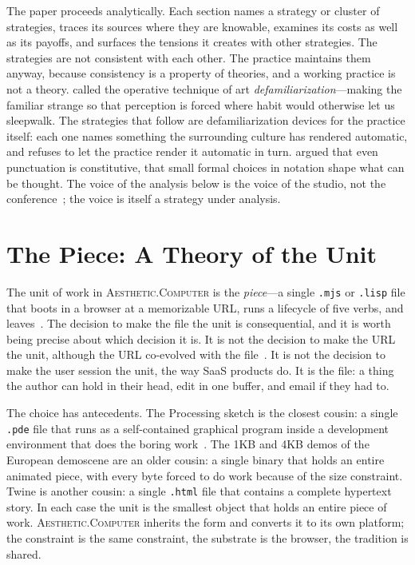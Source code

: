 \documentclass[10pt,letterpaper,twocolumn]{article}
\newcommand{\ac}{\textsc{Aesthetic.Computer}}
\begin{document}
The paper proceeds analytically. Each section names a strategy or cluster of strategies, traces its sources where they are knowable, examines its costs as well as its payoffs, and surfaces the tensions it creates with other strategies. The strategies are not consistent with each other. The practice maintains them anyway, because consistency is a property of theories, and a working practice is not a theory. \citet{shklovsky1917art} called the operative technique of art \emph{defamiliarization}---making the familiar strange so that perception is forced where habit would otherwise let us sleepwalk. The strategies that follow are defamiliarization devices for the practice itself: each one names something the surrounding culture has rendered automatic, and refuses to let the practice render it automatic in turn. \citet{adorno1990punctuation} argued that even punctuation is constitutive, that small formal choices in notation shape what can be thought. The voice of the analysis below is the voice of the studio, not the conference~\citep{scudder2026voice}; the voice is itself a strategy under analysis.

\section{The Piece: A Theory of the Unit}

The unit of work in \ac{} is the \emph{piece}---a single \texttt{.mjs} or \texttt{.lisp} file that boots in a browser at a memorizable URL, runs a lifecycle of five verbs, and leaves~\citep{scudder2026pieces}. The decision to make the file the unit is consequential, and it is worth being precise about which decision it is. It is not the decision to make the URL the unit, although the URL co-evolved with the file~\citep{scudder2026url}. It is not the decision to make the user session the unit, the way SaaS products do. It is the file: a thing the author can hold in their head, edit in one buffer, and email if they had to.

The choice has antecedents. The Processing sketch is the closest cousin: a single \texttt{.pde} file that runs as a self-contained graphical program inside a development environment that does the boring work~\citep{montfort201210print}. The 1KB and 4KB demos of the European demoscene are an older cousin: a single binary that holds an entire animated piece, with every byte forced to do work because of the size constraint. Twine is another cousin: a single \texttt{.html} file that contains a complete hypertext story. In each case the unit is the smallest object that holds an entire piece of work. \ac{} inherits the form and converts it to its own platform; the constraint is the same constraint, the substrate is the browser, the tradition is shared.
\end{document}

